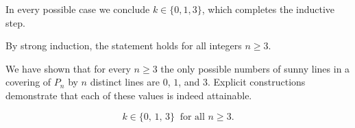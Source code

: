 In every possible case we conclude \(k \in \{0,1,3\}\), which completes the inductive step.\par
By strong induction, the statement holds for all integers \(n \ge 3\).\par
\smallskip
{}
We have shown that for every \(n \ge 3\) the only possible numbers of sunny lines in a covering of \(P_n\) by \(n\) distinct lines are \(0\), \(1\), and \(3\). Explicit constructions demonstrate that each of these values is indeed attainable.\par
\[
\boxed{k \in \{0,\,1,\,3\}\ \text{ for all } n\ge 3.}
\]
\par
